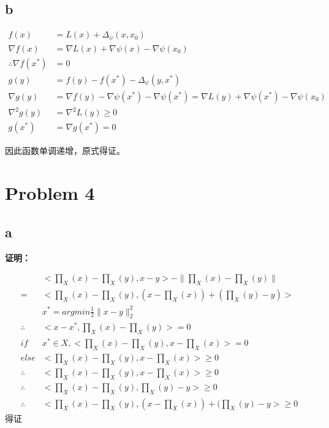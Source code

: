 \documentclass[12pt,a4paper,fontset=none]{ctexart}
\begin{document}
\subsection{b}
\begin{align*}
	f(x)                     & =L(x)+\Delta_\psi(x,x_0)                                                                     \\
	\nabla f(x)              & =\nabla L(x)+\nabla \psi(x)-\nabla \psi(x_0)                                                 \\
	\therefore \nabla f(x^*) & =0                                                                                           \\
	g(y)                     & =f(y)-f(x^*)-\Delta_\psi(y,x^*)                                                              \\
	\nabla g(y)              & =\nabla f(y)-\nabla \psi(x^*)-\nabla \psi(x^*)=\nabla L(y)+\nabla \psi(x^*)-\nabla \psi(x_0) \\
	\nabla^2g(y)             & =\nabla^2L(y)\geq 0                                                                          \\
	g(x^*)                   & =\nabla g(x^*)=0
\end{align*}

因此函数单调递增，原式得证。
\section{Problem 4}
\subsection{a}
\textbf{证明：}

\begin{align*}
	           & <\prod_X(x)-\prod_X(y),x-y> -\|\prod_X(x)-\prod_X(y)\|      \\
	=          & <\prod_X(x)-\prod_X(y),(x-\prod_X(x))+(\prod_X(y)-y)>       \\
	           & x^*=argmin \frac{1}{2} \|x-y\|_2^2                          \\
	\therefore & <x-x^*,\prod_X(x)-\prod_X(y)> =0                            \\
	if         & x^*\in X,<\prod_X(x)-\prod_X(y),x-\prod_X(x)> =0            \\
	else       & <\prod_X(x)-\prod_X(y),x-\prod_X(x)> \geq 0                 \\
	\therefore & <\prod_X(x)-\prod_X(y),x-\prod_X(x)> \geq 0                 \\
	\therefore & <\prod_X(x)-\prod_X(y),\prod_X(y)-y> \geq 0                 \\
	\therefore & <\prod_X(x)-\prod_X(y),(x-\prod_X(x))+(\prod_X(y)-y> \geq 0
\end{align*}
得证
\end{document}
